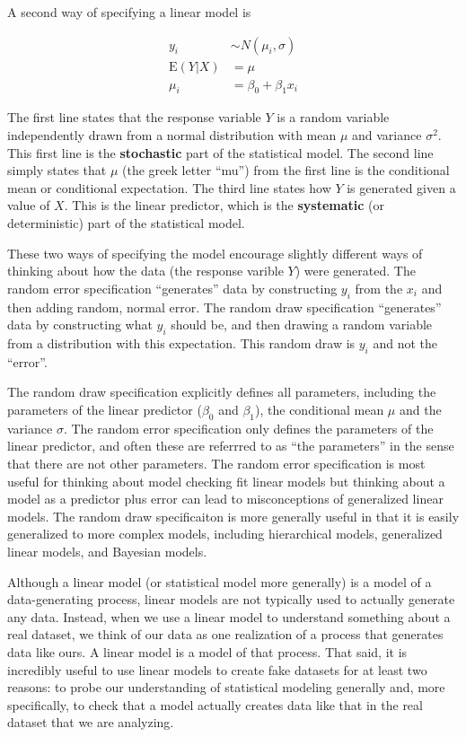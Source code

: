 \documentclass[]{book}
\begin{document}
A second way of specifying a linear model is

\begin{align}
y_i &\sim N(\mu_i, \sigma)\\
\mathrm{E}(Y|X) &= \mu\\
\mu_i &= \beta_0 + \beta_1 x_i
\label{eq:lm-spec2}
\end{align}

The first line states that the response variable \(Y\) is a random
variable independently drawn from a normal distribution with mean
\(\mu\) and variance \(\sigma^2\). This first line is the
\textbf{stochastic} part of the statistical model. The second line
simply states that \(\mu\) (the greek letter ``mu'') from the first line
is the conditional mean or conditional expectation. The third line
states how \(Y\) is generated given a value of \(X\). This is the linear
predictor, which is the \textbf{systematic} (or deterministic) part of
the statistical model.

These two ways of specifying the model encourage slightly different ways
of thinking about how the data (the response varible \(Y\)) were
generated. The random error specification ``generates'' data by
constructing \(y_i\) from the \(x_i\) and then adding random, normal
error. The random draw specification ``generates'' data by constructing
what \(y_i\) should be, and then drawing a random variable from a
distribution with this expectation. This random draw is \(y_i\) and not
the ``error''.

The random draw specification explicitly defines all parameters,
including the parameters of the linear predictor (\(\beta_0\) and
\(\beta_1\)), the conditional mean \(\mu\) and the variance \(\sigma\).
The random error specification only defines the parameters of the linear
predictor, and often these are referrred to as ``the parameters'' in the
sense that there are not other parameters. The random error
specification is most useful for thinking about model checking fit
linear models but thinking about a model as a predictor plus error can
lead to misconceptions of generalized linear models. The random draw
specificaiton is more generally useful in that it is easily generalized
to more complex models, including hierarchical models, generalized
linear models, and Bayesian models.

Although a linear model (or statistical model more generally) is a model
of a data-generating process, linear models are not typically used to
actually generate any data. Instead, when we use a linear model to
understand something about a real dataset, we think of our data as one
realization of a process that generates data like ours. A linear model
is a model of that process. That said, it is incredibly useful to use
linear models to create fake datasets for at least two reasons: to probe
our understanding of statistical modeling generally and, more
specifically, to check that a model actually creates data like that in
the real dataset that we are analyzing.
\end{document}
